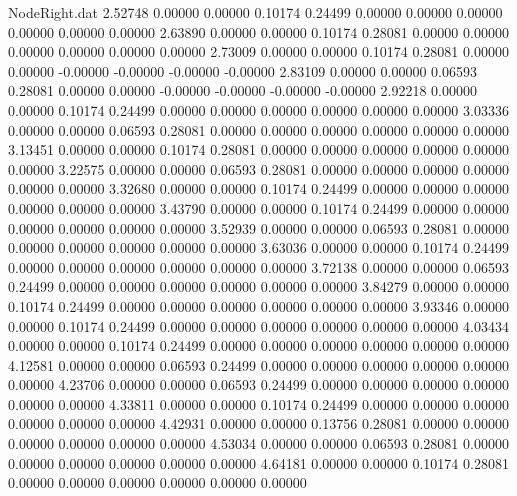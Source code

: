 \begin{filecontents}{NodeRight.dat}
   2.52748    0.00000    0.00000     0.10174    0.24499    0.00000    0.00000    0.00000    0.00000    0.00000    0.00000
   2.63890    0.00000    0.00000     0.10174    0.28081    0.00000    0.00000    0.00000    0.00000    0.00000    0.00000
   2.73009    0.00000    0.00000     0.10174    0.28081    0.00000    0.00000   -0.00000   -0.00000   -0.00000   -0.00000
   2.83109    0.00000    0.00000     0.06593    0.28081    0.00000    0.00000   -0.00000   -0.00000   -0.00000   -0.00000
   2.92218    0.00000    0.00000     0.10174    0.24499    0.00000    0.00000    0.00000    0.00000    0.00000    0.00000
   3.03336    0.00000    0.00000     0.06593    0.28081    0.00000    0.00000    0.00000    0.00000    0.00000    0.00000
   3.13451    0.00000    0.00000     0.10174    0.28081    0.00000    0.00000    0.00000    0.00000    0.00000    0.00000
   3.22575    0.00000    0.00000     0.06593    0.28081    0.00000    0.00000    0.00000    0.00000    0.00000    0.00000
   3.32680    0.00000    0.00000     0.10174    0.24499    0.00000    0.00000    0.00000    0.00000    0.00000    0.00000
   3.43790    0.00000    0.00000     0.10174    0.24499    0.00000    0.00000    0.00000    0.00000    0.00000    0.00000
   3.52939    0.00000    0.00000     0.06593    0.28081    0.00000    0.00000    0.00000    0.00000    0.00000    0.00000
   3.63036    0.00000    0.00000     0.10174    0.24499    0.00000    0.00000    0.00000    0.00000    0.00000    0.00000
   3.72138    0.00000    0.00000     0.06593    0.24499    0.00000    0.00000    0.00000    0.00000    0.00000    0.00000
   3.84279    0.00000    0.00000     0.10174    0.24499    0.00000    0.00000    0.00000    0.00000    0.00000    0.00000
   3.93346    0.00000    0.00000     0.10174    0.24499    0.00000    0.00000    0.00000    0.00000    0.00000    0.00000
   4.03434    0.00000    0.00000     0.10174    0.24499    0.00000    0.00000    0.00000    0.00000    0.00000    0.00000
   4.12581    0.00000    0.00000     0.06593    0.24499    0.00000    0.00000    0.00000    0.00000    0.00000    0.00000
   4.23706    0.00000    0.00000     0.06593    0.24499    0.00000    0.00000    0.00000    0.00000    0.00000    0.00000
   4.33811    0.00000    0.00000     0.10174    0.24499    0.00000    0.00000    0.00000    0.00000    0.00000    0.00000
   4.42931    0.00000    0.00000     0.13756    0.28081    0.00000    0.00000    0.00000    0.00000    0.00000    0.00000
   4.53034    0.00000    0.00000     0.06593    0.28081    0.00000    0.00000    0.00000    0.00000    0.00000    0.00000
   4.64181    0.00000    0.00000     0.10174    0.28081    0.00000    0.00000    0.00000    0.00000    0.00000    0.00000

\end{filecontents}
